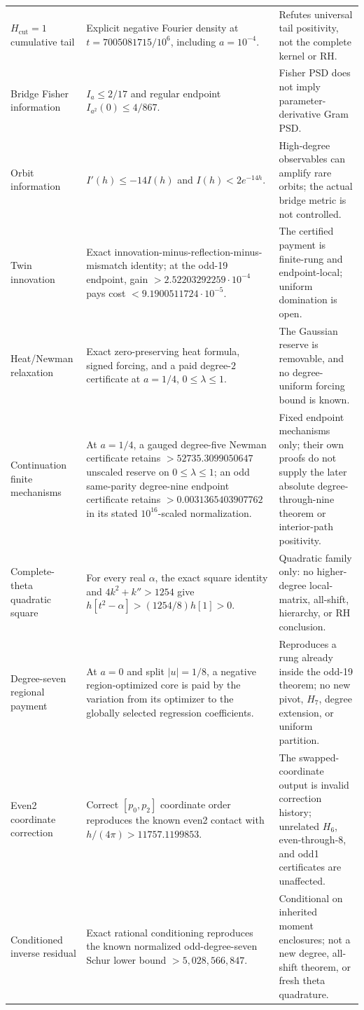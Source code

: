 \documentclass[11pt]{article}
\theoremstyle{definition}
\theoremstyle{remark}
\begin{document}
\begin{longtable}{>{\raggedright\arraybackslash}p{}
                  >{\raggedright\arraybackslash}p{}
                  >{\raggedright\arraybackslash}p{}}
$H_{\mathrm{cut}}=1$ cumulative tail & Explicit negative Fourier density at $t=7005081715/10^6$, including $a=10^{-4}$. & Refutes universal tail positivity, not the complete kernel or RH. \\
Bridge Fisher information & $I_a\le2/17$ and regular endpoint $I_{a^2}(0)\le4/867$. & Fisher PSD does not imply parameter-derivative Gram PSD. \\
Orbit information & $I'(h)\le-14I(h)$ and $I(h)<2e^{-14h}$. & High-degree observables can amplify rare orbits; the actual bridge metric is not controlled. \\
Twin innovation & Exact innovation-minus-reflection-minus-mismatch identity; at the odd-19 endpoint, gain $>2.52203292259\cdot10^{-4}$ pays cost $<9.1900511724\cdot10^{-5}$. & The certified payment is finite-rung and endpoint-local; uniform domination is open. \\
Heat/Newman relaxation & Exact zero-preserving heat formula, signed forcing, and a paid degree-$2$ certificate at $a=1/4$, $0\le\lambda\le1$. & The Gaussian reserve is removable, and no degree-uniform forcing bound is known. \\
Continuation finite mechanisms & At $a=1/4$, a gauged degree-five Newman certificate retains $>52735.3099050647$ unscaled reserve on $0\le\lambda\le1$; an odd same-parity degree-nine endpoint certificate retains $>0.0031365403907762$ in its stated $10^{16}$-scaled normalization. & Fixed endpoint mechanisms only; their own proofs do not supply the later absolute degree-through-nine theorem or interior-path positivity. \\
Complete-theta quadratic square & For every real $\alpha$, the exact square identity and $4k^2+k''>1254$ give $h[t^2-\alpha]>(1254/8)h[1]>0$. & Quadratic family only: no higher-degree local-matrix, all-shift, hierarchy, or RH conclusion. \\
Degree-seven regional payment & At $a=0$ and split $|u|=1/8$, a negative region-optimized core is paid by the variation from its optimizer to the globally selected regression coefficients. & Reproduces a rung already inside the odd-19 theorem; no new pivot, $H_7$, degree extension, or uniform partition. \\
Even2 coordinate correction & Correct $[p_0,p_2]$ coordinate order reproduces the known even2 contact with $h/(4\pi)>11757.1199853$. & The swapped-coordinate output is invalid correction history; unrelated $H_6$, even-through-8, and odd1 certificates are unaffected. \\
Conditioned inverse residual & Exact rational conditioning reproduces the known normalized odd-degree-seven Schur lower bound $>5{,}028{,}566{,}847$. & Conditional on inherited moment enclosures; not a new degree, all-shift theorem, or fresh theta quadrature. \\

\end{longtable}
\end{document}

